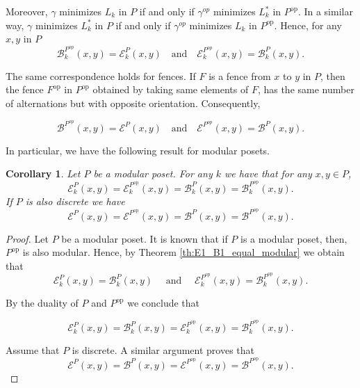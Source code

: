 \documentclass{article}[12pt]
\theoremstyle{exampstyle}
\newtheorem{theorem}{Theorem}[section]
\newtheorem{corollary}[theorem]{Corollary}
\theoremstyle{remark}
\newcommand{\B}{\mathcal{B}}
\newcommand{\E}{\mathcal{E}}
\newcommand{\op}{\text{op}}
\begin{document}
Moreover, $\gamma$ minimizes $L_k$ in $P$ if and only if $\gamma^{op}$ minimizes $L^*_k$ in $P^{\op}$. In a similar way, $\gamma$ minimizes $L^*_k$ in $P$ if and only if $\gamma^{op}$ minimizes $L_k$ in $P^{\op}$. Hence, for any $x,y$ in $P$ 
\[ \B^{P^{op}}_k(x,y) = \E^P_k(x,y)  \quad \text{and} \quad \E^{P^{op}}_k(x,y) = \B^P_k(x,y).   \]

The same correspondence holds for fences. If $F$ is a fence from $x$ to $y$ in $P$, then the fence $F^{\op}$ in $P^{\op}$ obtained by taking same elements of $F$, has the same number of alternations but with opposite orientation. Consequently,  

\[ \B^{P^{op}}(x,y) = \E^P(x,y)  \quad \text{and} \quad \E^{P^{op}}(x,y) = \B^P(x,y).   \]

In particular, we have the following result for modular posets.

\begin{corollary}
    Let $P$ be a modular poset. For any $k$ we have that for any $x,y \in P$,
    \[ \E^P_k(x,y) =  \E^{P^{\op}}_k(x,y) = \B^P_k(x,y) =\B^{P^{\op}}_k(x,y).\]
    If $P$ is also discrete we have 
    \[ \E^P(x,y) = \E^{P^{\op}}(x,y) =  \B^P(x,y)   =\B^{P^{\op}}(x,y).\]
    \label{cor:modular_posets_distance}  
\end{corollary}
\begin{proof}
    Let $P$ be a modular poset. It is known that if $P$ is a modular poset, then, $P^{\op}$ is also modular. Hence, by Theorem \ref{th:E1_B1_equal_modular} we obtain that 
    \[ \E^P_k(x,y) =  \B^P_k(x,y) \quad \text{ and } \quad \E^{P^{\op}}_k(x,y) =  \B^{P^{\op}}_k(x,y). \]
    
    By the duality of $P$ and $P^{\op}$ we conclude that 
    
    \[ \E^P_k(x,y) =  \B^P_k(x,y) = \E^{P^{\op}}_k(x,y) =\B^{P^{\op}}_k(x,y).\]

    Assume that $P$ is discrete. A similar argument  proves that 
     \[ \E^P(x,y) =  \B^P(x,y) = \E^{P^{\op}}(x,y) =\B^{P^{\op}}(x,y).\]
\end{proof}

\end{document}
